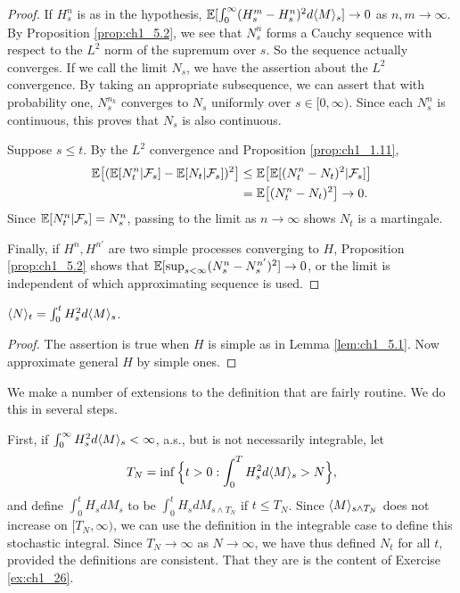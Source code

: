 \begin{proof}
If $H_s^n$ is as in the hypothesis, $\mathbb{E}[\int_0^\infty(H_s^m - H_s^n)^2d\langle M \rangle_s] \to 0$ as $n,m \to \infty$. By Proposition \ref{prop:ch1_5.2}, we see that $N_s^n$ forms a Cauchy sequence with respect to the $L^2$ norm of the supremum over $s$. So the sequence actually converges. If we call the limit $N_s$, we have the assertion about the $L^2$ convergence. By taking an appropriate subsequence, we can assert that with probability one, $N_s^{n_k}$ converges to $N_s$ uniformly over $s \in [0,\infty)$. Since each $N_s^n$ is continuous, this proves that $N_s$ is also continuous.

Suppose $s \leq t$. By the $L^2$ convergence and Proposition \ref{prop:ch1_1.11},
\begin{align*}
    \mathbb{E}\big[(\mathbb{E}[N_t^n| \mathcal{F}_s] - \mathbb{E}[N_t| \mathcal{F}_s])^2\big] &\leq \mathbb{E}\big[\mathbb{E}[(N_t^n - N_t)^2| \mathcal{F}_s]\big] \\
    & = \mathbb{E}\big[(N_t^n - N_t)^2\big] \to 0.
\end{align*}
Since $\mathbb{E}[N_t^n| \mathcal{F}_s] = N_s^n$, passing to the limit as $n \to \infty$ shows $N_t$ is a martingale.

Finally, if $H^n, H^{n'}$ are two simple processes converging to $H$, Proposition \ref{prop:ch1_5.2} shows that $\mathbb{E}[\sup_{s<\infty}(N_s^n - N_s^{n'})^2] \to 0$, or the limit is independent of which approximating sequence is used.
\end{proof}

\begin{corollary}\label{cor:ch1_5.4}
$\langle N \rangle_t = \int_0^t H_s^2d\langle M \rangle_s$.
\end{corollary}

\begin{proof}
The assertion is true when $H$ is simple as in Lemma \ref{lem:ch1_5.1}. Now approximate general $H$ by simple ones.
\end{proof}


We make a number of extensions to the definition that are fairly routine. We do this in several steps.

First, if $\int_0^\infty H_s^2d\langle M \rangle_s < \infty$, a.s., but is not necessarily integrable, let
\[
    T_N = \inf\Big\{t > 0 : \int_0^T H_s^2d\langle M \rangle_s > N\Big\},
\]
and define $\int_0^t H_s dM_s$ to be $\int_0^t H_s dM_{s\wedge T_N}$ if $t \leq T_N$. Since $\langle M \rangle_{s\wedge T_N}$ does not increase on $[T_N,\infty)$, we can use the definition in the integrable case to define this stochastic integral. Since $T_N \to \infty$ as $N \to \infty$, we have thus defined $N_t$ for all $t$, provided the definitions are consistent. That they are is the content of Exercise \ref{ex:ch1_26}.

